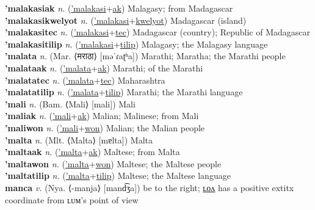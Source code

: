 \textbf{'malakasiak} \textit{n.} (\hyperref['malakasi]{'malakasi}+\hyperref[ak]{ak})
Malagasy; from Madagascar \label{'malakasiak} \\
\textbf{'malakasikwelyot} \textit{n.} (\hyperref['malakasi]{'malakasi}+\hyperref[kwelyot]{kwelyot})
Madagascar (island) \label{'malakasikwelyot} \\
\textbf{'malakasitec} \textit{n.} (\hyperref['malakasi]{'malakasi}+\hyperref[tec]{tec})
Madagascar (country); Republic of Madagascar \label{'malakasitec} \\
\textbf{'malakasitilip} \textit{n.} (\hyperref['malakasi]{'malakasi}+\hyperref[tilip]{tilip})
Malagasy; the Malagasy language \label{'malakasitilip} \\
\textbf{'malata} \textit{n.} (Mar. ⟨मराठा⟩ [məˈɾaʈʰa])
Marathi; Maratha; the Marathi people \label{'malata} \\
\textbf{'malataak} \textit{n.} (\hyperref['malata]{'malata}+\hyperref[ak]{ak})
Marathi; of the Marathi \label{'malataak} \\
\textbf{'malatatec} \textit{n.} (\hyperref['malata]{'malata}+\hyperref[tec]{tec})
Maharashtra \label{'malatatec} \\
\textbf{'malatatilip} \textit{n.} (\hyperref['malata]{'malata}+\hyperref[tilip]{tilip})
Marathi; the Marathi language \label{'malatatilip} \\
\textbf{'mali} \textit{n.} (Bam. ⟨Mali⟩ [mali])
Mali \label{'mali} \\
\textbf{'maliak} \textit{n.} (\hyperref['mali]{'mali}+\hyperref[ak]{ak})
Malian; Malinese; from Mali \label{'maliak} \\
\textbf{'maliwon} \textit{n.} (\hyperref['mali]{'mali}+\hyperref[won]{won})
Malian; the Malian people \label{'maliwon} \\
\textbf{'malta} \textit{n.} (Mlt. ⟨Malta⟩ [mɐlta])
Malta \label{'malta} \\
\textbf{'maltaak} \textit{n.} (\hyperref['malta]{'malta}+\hyperref[ak]{ak})
Maltese; from Malta \label{'maltaak} \\
\textbf{'maltawon} \textit{n.} (\hyperref['malta]{'malta}+\hyperref[won]{won})
Maltese; the Maltese people \label{'maltawon} \\
\textbf{'maltatilip} \textit{n.} (\hyperref['malta]{'malta}+\hyperref[tilip]{tilip})
Maltese; the Maltese language \label{'maltatilip} \\
\textbf{manca} \textit{v.} (Nya. ⟨-manja⟩ [mand͡ʒa])
be to the right; \hyperref[mancalon]{ʟᴏᴧ} has a positive 	extit{x} coordinate from ʟᴜᴍ's point of view \label{manca} \\
